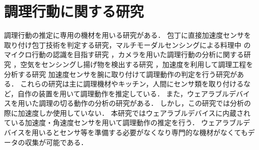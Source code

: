 \section{調理行動に関する研究}
調理行動の推定に専用の機材を用いる研究がある．
包丁に直接加速度センサを取り付け包丁技術を判定する研究\cite{加速度センサを用いた包丁技術向上支援システムの提案}，マルチモーダルセンシングによる料理中
のマイクロ行動の認識を目指す研究\cite{マルチモーダルセンシングに基づく料理中のマイクロ行動認識の提案}
，カメラを用いた調理行動の分析に関する研究\cite{Cooking Activities Recognition in Egocentric Videos Using Hand Shape Feature with Openpose}
，空気をセンシングし揚げ物を検出する研究\cite{NOSE: A Novel Odor Sensing Engine for Ambient Monitoring of the Frying Cooking Method in Kitchen Environments}
，加速度を利用して調理工程を分析する研究\cite{A dataset for complex activity recognition with micro and macro activities in a cooking scenario} 
加速度センサを腕に取り付けて調理動作の判定を行う研究\cite{手首装着型の加速度センサを用いた実時間調理行動認識手法の実現}がある．
これらの研究は主に調理機材やキッチン，人間にセンサ類を取り付けるなど，自作の装置を用いて調理動作を推定している．
また，ウェアラブルデバイスを用いた調理の切る動作の分析の研究がある\cite{kumazawaanalysis}．
しかし，この研究では分析の際に加速度しか使用していない．
本研究ではウェアラブルデバイスに内蔵されている加速度・角速度センサを用いて調理動作の推定を行う．
ウェアラブルデバイスを用いるとセンサ等を準備する必要がなくなり専門的な機材がなくてもデータの収集が可能である．

